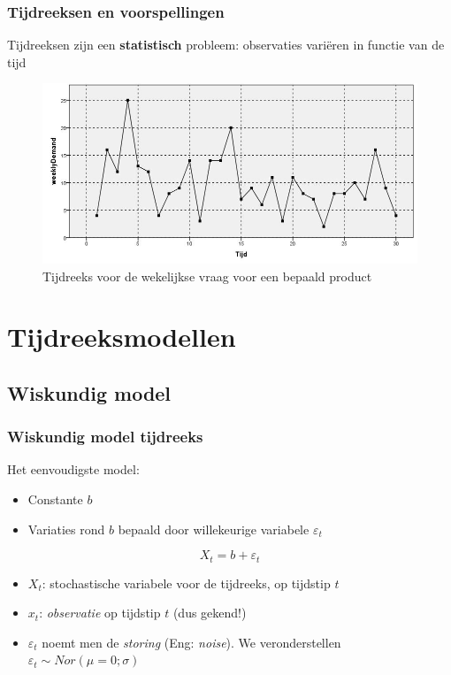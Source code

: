 \documentclass{beamer}
\begin{document}
\begin{frame}
  \frametitle{Tijdreeksen en voorspellingen}

  Tijdreeksen zijn een \textbf{statistisch} probleem: observaties variëren in functie van de tijd

  \begin{figure}
    \centering
    \includegraphics[width=\textwidth]{img/tijdreeks11}
    \caption{Tijdreeks voor de wekelijkse vraag voor een bepaald product}
  \end{figure}
\end{frame}

\section{Tijdreeksmodellen}

\subsection{Wiskundig model}

\begin{frame}
  \frametitle{Wiskundig model tijdreeks}

  Het eenvoudigste model:

  \begin{itemize}
    \item Constante $b$
    \item Variaties rond $b$ bepaald door willekeurige variabele $\varepsilon_{t}$
  \end{itemize}

  \begin{equation}
    X_{t} = b + \varepsilon_{t}
    \label{eq:tijdreeks-constante}
  \end{equation}

  \begin{itemize}
    \item $X_{t}$: stochastische variabele voor de tijdreeks, op tijdstip $t$
    \item $x_{t}$: \emph{observatie} op tijdstip $t$ (dus gekend!)
    \item $\varepsilon_{t}$ noemt men de \emph{storing} (Eng: \emph{noise}). We veronderstellen $\varepsilon_{t} \sim Nor(\mu = 0; \sigma)$
  \end{itemize}
\end{frame}
\end{document}
